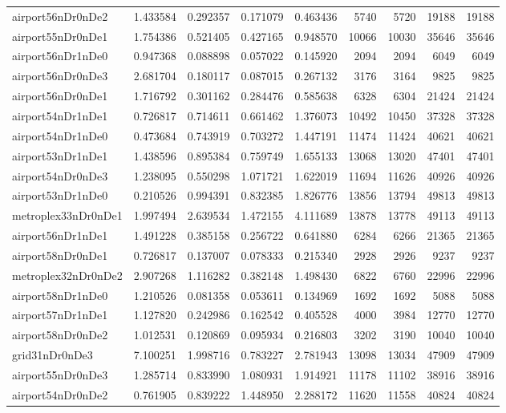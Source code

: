 \begin{longtable}{|l|r|r|r|r|r|r|r|r|}
airport56nDr0nDe2 & 1.433584 & 0.292357 & 0.171079 & 0.463436 & 5740 & 5720 & 19188 & 19188 \\
airport55nDr0nDe1 & 1.754386 & 0.521405 & 0.427165 & 0.948570 & 10066 & 10030 & 35646 & 35646 \\
airport56nDr1nDe0 & 0.947368 & 0.088898 & 0.057022 & 0.145920 & 2094 & 2094 & 6049 & 6049 \\
airport56nDr0nDe3 & 2.681704 & 0.180117 & 0.087015 & 0.267132 & 3176 & 3164 & 9825 & 9825 \\
airport56nDr0nDe1 & 1.716792 & 0.301162 & 0.284476 & 0.585638 & 6328 & 6304 & 21424 & 21424 \\
airport54nDr1nDe1 & 0.726817 & 0.714611 & 0.661462 & 1.376073 & 10492 & 10450 & 37328 & 37328 \\
airport54nDr1nDe0 & 0.473684 & 0.743919 & 0.703272 & 1.447191 & 11474 & 11424 & 40621 & 40621 \\
airport53nDr1nDe1 & 1.438596 & 0.895384 & 0.759749 & 1.655133 & 13068 & 13020 & 47401 & 47401 \\
airport54nDr0nDe3 & 1.238095 & 0.550298 & 1.071721 & 1.622019 & 11694 & 11626 & 40926 & 40926 \\
airport53nDr1nDe0 & 0.210526 & 0.994391 & 0.832385 & 1.826776 & 13856 & 13794 & 49813 & 49813 \\
metroplex33nDr0nDe1 & 1.997494 & 2.639534 & 1.472155 & 4.111689 & 13878 & 13778 & 49113 & 49113 \\
airport56nDr1nDe1 & 1.491228 & 0.385158 & 0.256722 & 0.641880 & 6284 & 6266 & 21365 & 21365 \\
airport58nDr0nDe1 & 0.726817 & 0.137007 & 0.078333 & 0.215340 & 2928 & 2926 & 9237 & 9237 \\
metroplex32nDr0nDe2 & 2.907268 & 1.116282 & 0.382148 & 1.498430 & 6822 & 6760 & 22996 & 22996 \\
airport58nDr1nDe0 & 1.210526 & 0.081358 & 0.053611 & 0.134969 & 1692 & 1692 & 5088 & 5088 \\
airport57nDr1nDe1 & 1.127820 & 0.242986 & 0.162542 & 0.405528 & 4000 & 3984 & 12770 & 12770 \\
airport58nDr0nDe2 & 1.012531 & 0.120869 & 0.095934 & 0.216803 & 3202 & 3190 & 10040 & 10040 \\
grid31nDr0nDe3 & 7.100251 & 1.998716 & 0.783227 & 2.781943 & 13098 & 13034 & 47909 & 47909 \\
airport55nDr0nDe3 & 1.285714 & 0.833990 & 1.080931 & 1.914921 & 11178 & 11102 & 38916 & 38916 \\
airport54nDr0nDe2 & 0.761905 & 0.839222 & 1.448950 & 2.288172 & 11620 & 11558 & 40824 & 40824 \\

\end{longtable}
